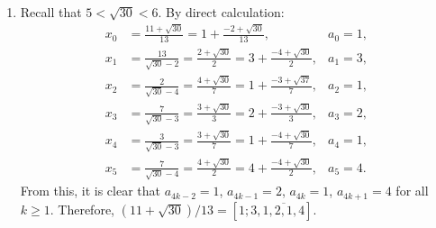 \begin{solution}
\begin{enumerate}
\begin{align*}
            x_0 &= \frac{5 + \sqrt{37}}{4} = 2 + \frac{-3 + \sqrt{37}}{4}, & a_0 = 2, \\
            x_1 &= \frac{4}{\sqrt{37} - 3} = \frac{3 + \sqrt{37}}{7} = 1 + \frac{-4 + \sqrt{37}}{7}, & a_1 = 1, \\
            x_2 &= \frac{7}{\sqrt{37} - 4} = \frac{4 + \sqrt{37}}{3} = 3 + \frac{-5 + \sqrt{37}}{3}, & a_2 = 3, \\
            x_3 &= \frac{3}{\sqrt{37} - 5} = \frac{5 + \sqrt{37}}{4} = 2 + \frac{-3 + \sqrt{37}}{4}, & a_3 = 2.
        \end{align*}
        From this, it is clear that $a_{3k} = 2$, $a_{3k+1} = 1$, $a_{3k+2} = 3$ for all $k \geq 0$. Therefore, $(5 + \sqrt{37})/4 = [\overline{2; 1, 3}]$.
        \item Recall that $5 < \sqrt{30} < 6$. By direct calculation:
        \begin{align*}
            x_0 &= \frac{11 + \sqrt{30}}{13} = 1 + \frac{-2 + \sqrt{30}}{13}, & a_0 = 1, \\
            x_1 &= \frac{13}{\sqrt{30} - 2} = \frac{2 + \sqrt{30}}{2} = 3 + \frac{-4 + \sqrt{30}}{2}, & a_1 = 3, \\
            x_2 &= \frac{2}{\sqrt{30} - 4} = \frac{4 + \sqrt{30}}{7} = 1 + \frac{-3 + \sqrt{37}}{7}, & a_2 = 1, \\
            x_3 &= \frac{7}{\sqrt{30} - 3} = \frac{3 + \sqrt{30}}{3} = 2 + \frac{-3 + \sqrt{30}}{3}, & a_3 = 2, \\
            x_4 &= \frac{3}{\sqrt{30} - 3} = \frac{3 + \sqrt{30}}{7} = 1 + \frac{-4 + \sqrt{30}}{7}, & a_4 = 1, \\
            x_5 &= \frac{7}{\sqrt{30} - 4} = \frac{4 + \sqrt{30}}{2} = 4 + \frac{-4 + \sqrt{30}}{2}, & a_5 = 4.
        \end{align*}
        From this, it is clear that $a_{4k-2} = 1$, $a_{4k-1} = 2$, $a_{4k} = 1$, $a_{4k+1} = 4$ for all $k \geq 1$. Therefore, $(11 + \sqrt{30})/13 = [1; 3, \overline{1, 2, 1, 4}]$. \\
    \end{enumerate}
\end{solution}

\begin{exercise}
\end{exercise}

